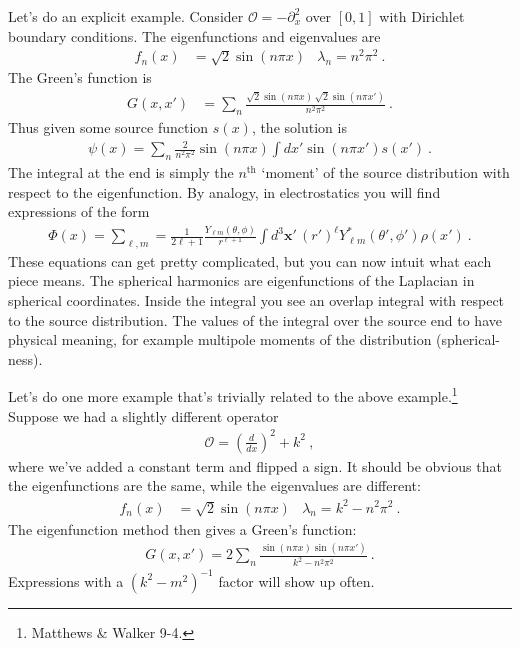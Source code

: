 \documentclass[12pt]{article}
\numberwithin{equation}{section}    %
\renewcommand{\vec}[1]{\mathbf{#1}} %
\begin{document}
Let’s do an explicit example. Consider $\mathcal O = -\partial_x^2$ over $[0,1]$ with Dirichlet boundary conditions. The eigenfunctions and eigenvalues are
\begin{align}
  f_n(x) &= \sqrt{2} \sin(n\pi x)
  & 
  \lambda_n = n^2 \pi^2 \ .
\end{align}
The Green’s function is
\begin{align}
  G(x,x') &= \sum_n \frac{\sqrt{2} \sin(n\pi x) \, \sqrt{2}\sin(n\pi x')}{n^2\pi^2} \ .
\end{align}
Thus given some source function $s(x)$, the solution is
\begin{align}
  \psi(x) = \sum_n \frac{2}{n^2\pi^2} \sin(n\pi x) \int dx' \sin(n\pi x') s(x') \ .
\end{align}
The integral at the end is simply the $n^\text{th}$ `moment’ of the source distribution with respect to the eigenfunction. By analogy, in electrostatics you will find expressions of the form
\begin{align}
  \Phi(x) = \sum_{\ell, m} = \frac{1}{2\ell + 1} \frac{Y_{\ell m}(\theta, \phi)}{r^{\ell+1}} \int d^3\vec x' \, (r')^\ell Y^*_{\ell m}(\theta',\phi') \rho(x') \ .
\end{align}
These equations can get pretty complicated, but you can now intuit what each piece means. The spherical harmonics are eigenfunctions of the Laplacian in spherical coordinates. Inside the integral you see an overlap integral with respect to the source distribution. The values of the integral over the source end to have physical meaning, for example multipole moments of the distribution (spherical-ness). 

Let’s do one more example that’s trivially related to the above example.\footnote{Matthews \& Walker 9-4.} Suppose we had a slightly different operator
\begin{align}
  \mathcal O = \left(\frac{d}{dx}\right)^2 + k^2 \ ,
  \label{eq:example:operator:dx2:k2}
\end{align}
where we’ve added a constant term and flipped a sign. It should be obvious that the eigenfunctions are the same, while the eigenvalues are different:
\begin{align}
  f_n(x) &= \sqrt{2} \sin(n\pi x)
  & 
  \lambda_n = k^2 - n^2 \pi^2 \ .
  \label{eq:example:d2:k2:eigenfunctions}
\end{align}
The eigenfunction method then gives a Green’s function:
\begin{align}
  G(x,x')= 2\sum_n \frac{\sin(n\pi x) \sin(n\pi x')}{k^2 - n^2\pi^2} \ .
\end{align}
Expressions with a $(k^2 - m^2)^{-1}$ factor will show up often.
\end{document}
